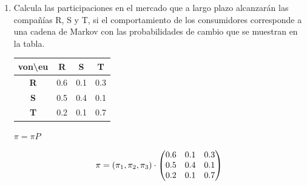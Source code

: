 \documentclass{templateNote}
\begin{document}
\begin{enumerate}
\begin{enumerate}[label=\alph*)]
    \end{enumerate}

    \newpage
    \item Calcula las participaciones en el mercado que a largo plazo alcanzarán las compañías R, S y T, si el comportamiento de los consumidores corresponde a una cadena de Markov con las probabilidades de cambio que se muestran en la tabla.
        \begin{center}
            \begin{tabular}{|c|c|c|c|}
                \hline
                von\textbackslash eu & \textbf{R} & \textbf{S} & \textbf{T} \\ \hline
                \textbf{R} & 0.6 & 0.1 & 0.3 \\
                \textbf{S} & 0.5 & 0.4 & 0.1 \\ 
                \textbf{T} & 0.2 & 0.1 & 0.7 \\ \hline
            \end{tabular}
        \end{center}
        
        $\pi = \pi P$

        \begin{equation*}
            \pi = (\pi_1, \pi_2, \pi_3)\\
            \cdot 
            \begin{pmatrix}
                0.6 & 0.1 & 0.3\\
                0.5 & 0.4 & 0.1\\
                0.2 & 0.1 & 0.7\\
            \end{pmatrix}
        \end{equation*}


\end{enumerate}
\end{document}
